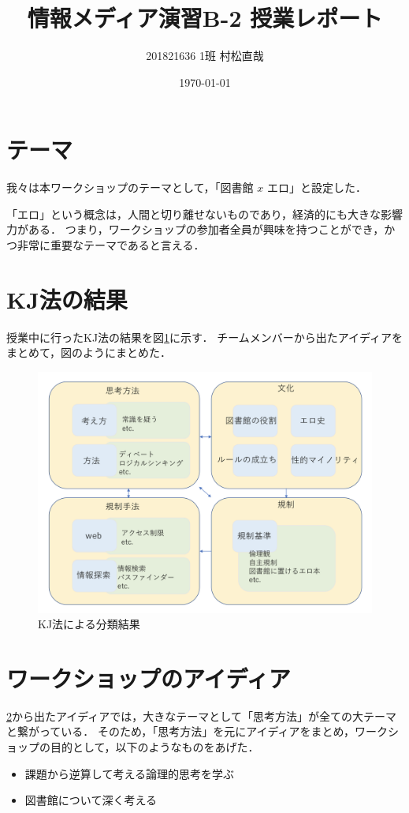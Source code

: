 \documentclass[uplatex,a4paper]{jsarticle}
\title{情報メディア演習B-2 授業レポート}
\author{201821636 1班 村松直哉}
\date{\today}
\begin{document}
\maketitle
%
%
\section{テーマ}
我々は本ワークショップのテーマとして，「図書館 $x$ エロ」と設定した．

「エロ」という概念は，人間と切り離せないものであり，経済的にも大きな影響力がある．
つまり，ワークショップの参加者全員が興味を持つことができ，かつ非常に重要なテーマであると言える．


\section{KJ法の結果} \label{sec:kj}
授業中に行ったKJ法の結果を図\ref{fig:result}に示す．
チームメンバーから出たアイディアをまとめて，図のようにまとめた．

\begin{figure}[htb]
\begin{center}
    \includegraphics[width=14cm]{figs/result.png}
\end{center}
\caption{KJ法による分類結果}
\label{fig:result}
\end{figure}


\section{ワークショップのアイディア}
\ref{sec:kj}から出たアイディアでは，大きなテーマとして「思考方法」が全ての大テーマと繋がっている．
そのため，「思考方法」を元にアイディアをまとめ，ワークショップの目的として，以下のようなものをあげた．
\begin{itemize}
    \item 課題から逆算して考える論理的思考を学ぶ
    \item 図書館について深く考える
\end{itemize}
\end{document}

